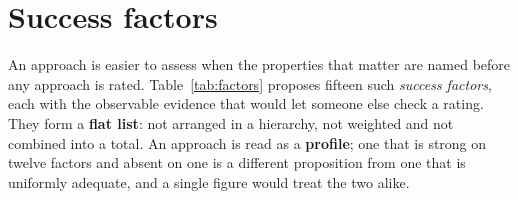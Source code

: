 \documentclass[10pt,twocolumn,a4paper]{article}
\begin{document}
\section{Success factors}
\label{sec:factors}

An approach is easier to assess when the properties that matter are named before any
approach is rated. Table~\ref{tab:factors} proposes fifteen such \emph{success
factors}, each with the observable evidence that would let someone else check a rating.
They form a \textbf{flat list}: not arranged in a hierarchy, not weighted and not
combined into a total. An approach is read as a \textbf{profile}; one that is strong on
twelve factors and absent on one is a different proposition from one that is uniformly
adequate, and a single figure would treat the two alike.
\end{document}
